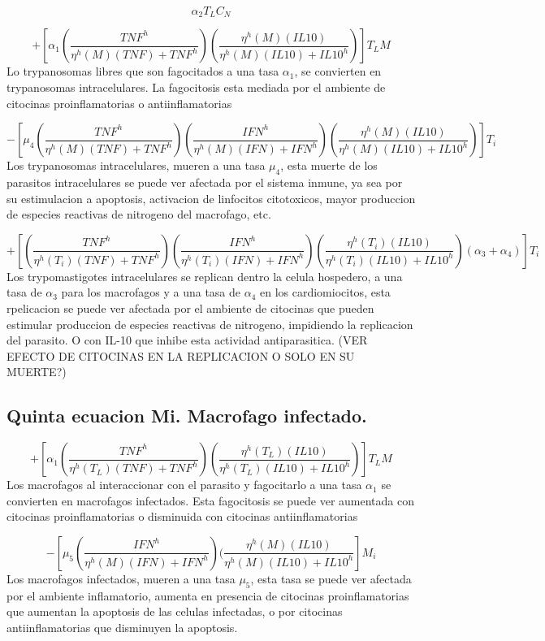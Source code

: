 \documentclass[
]{article}
\begin{document}
\[\alpha_{2}T_{L}C_{N}\]

\[+[\alpha_{1}(\dfrac{TNF^{h}}{\eta^{h}(M)(TNF)+ TNF^{h}})(\dfrac{\eta^{h}(M)(IL10)}{\eta^{h}(M)(IL10)+IL10^{h}})]T_{L}M  \]
Lo trypanosomas libres que son fagocitados a una tasa \(\alpha_{1}\), se
convierten en trypanosomas intracelulares. La fagocitosis esta mediada
por el ambiente de citocinas proinflamatorias o antiinflamatorias

\[-[\mu_{4}(\dfrac{TNF^{h}}{\eta^{h}(M)(TNF)+TNF^{h}})(\dfrac{IFN^{h}}{\eta^{h}(M)(IFN)+IFN^{h}})(\dfrac{\eta^{h}(M)(IL10)}{\eta^{h}(M)(IL10)+IL10^{h}})]T_{i} \]
Los trypanosomas intracelulares, mueren a una tasa \(\mu_{4}\), esta
muerte de los parasitos intracelulares se puede ver afectada por el
sistema inmune, ya sea por su estimulacion a apoptosis, activacion de
linfocitos citotoxicos, mayor produccion de especies reactivas de
nitrogeno del macrofago, etc.

\[+[(\dfrac{TNF^{h}}{\eta^{h}(T_{i})(TNF)+TNF^{h}})(\dfrac{IFN^{h}}{\eta^{h}(T_{i})(IFN)+IFN^{h}})(\dfrac{\eta^{h}(T_{i})(IL10)}{\eta^{h}(T_{i})(IL10)+IL10^{h}})(\alpha_{3}+\alpha_{4})]T_{i}\]
Los trypomastigotes intracelulares se replican dentro la celula
hospedero, a una tasa de \(\alpha_{3}\) para los macrofagos y a una tasa
de \(\alpha_{4}\) en los cardiomiocitos, esta rpelicacion se puede ver
afectada por el ambiente de citocinas que pueden estimular produccion de
especies reactivas de nitrogeno, impidiendo la replicacion del parasito.
O con IL-10 que inhibe esta actividad antiparasitica. (VER EFECTO DE
CITOCINAS EN LA REPLICACION O SOLO EN SU MUERTE?)

\hypertarget{quinta-ecuacion-mi.-macrofago-infectado.}{%
\subsection{Quinta ecuacion Mi. Macrofago
infectado.}\label{quinta-ecuacion-mi.-macrofago-infectado.}}

\[+[\alpha_{1}(\dfrac{TNF^{h}}{\eta^{h}(T_{L})(TNF)+TNF^{h}})(\dfrac{\eta^{h}(T_{L})(IL10)}{\eta^{h}(T_{L})(IL10)+IL10^{h}})]T_{L}M   \]
Los macrofagos al interaccionar con el parasito y fagocitarlo a una tasa
\(\alpha_{1}\) se convierten en macrofagos infectados. Esta fagocitosis
se puede ver aumentada con citocinas proinflamatorias o disminuida con
citocinas antiinflamatorias

\[-[\mu_{5}(\dfrac{IFN^{h}}{\eta^{h}(M)(IFN)+IFN^{h}})(\dfrac{\eta^{h}(M)(IL10)}{\eta^{h}(M)(IL10)+IL10^{h}}]M_{i}  \]
Los macrofagos infectados, mueren a una tasa \(\mu_{5}\), esta tasa se
puede ver afectada por el ambiente inflamatorio, aumenta en presencia de
citocinas proinflamatorias que aumentan la apoptosis de las celulas
infectadas, o por citocinas antiinflamatorias que disminuyen la
apoptosis.
\end{document}

